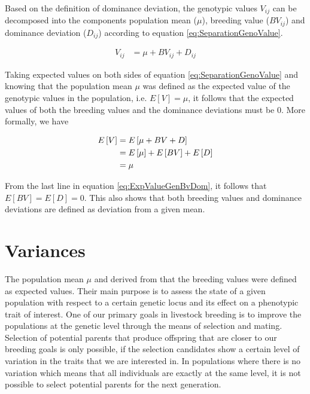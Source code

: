 \documentclass[]{book}
\theoremstyle{definition}
\theoremstyle{definition}
\theoremstyle{definition}
\theoremstyle{remark}
\begin{document}
Based on the definition of dominance deviation, the genotypic values \(V_{ij}\) can be decomposed into the components population mean (\(\mu\)), breeding value (\(BV_{ij}\)) and dominance deviation (\(D_{ij}\)) according to equation \eqref{eq:SeparationGenoValue}.

\begin{align}
V_{ij} &=   \mu + BV_{ij} + D_{ij}
\label{eq:SeparationGenoValue}
\end{align}

Taking expected values on both sides of equation \eqref{eq:SeparationGenoValue} and knowing that the population mean \(\mu\) was defined as the expected value of the genotypic values in the population, i.e. \(E\left[ V \right] = \mu\), it follows that the expected values of both the breeding values and the dominance deviations must be \(0\). More formally, we have

\begin{align}
E\left[ V \right] &=  E\left[ \mu + BV + D \right] \notag \\
                  &=  E\left[ \mu \right]  + E\left[ BV \right] + E\left[ D \right] \notag \\
                  &=  \mu
\label{eq:ExpValueGenBvDom}
\end{align}

From the last line in equation \eqref{eq:ExpValueGenBvDom}, it follows that \(E\left[ BV \right] = E\left[ D \right] = 0\). This also shows that both breeding values and dominance deviations are defined as deviation from a given mean.

\hypertarget{variances}{%
\section{Variances}\label{variances}}

The population mean \(\mu\) and derived from that the breeding values were defined as expected values. Their main purpose is to assess the state of a given population with respect to a certain genetic locus and its effect on a phenotypic trait of interest. One of our primary goals in livestock breeding is to improve the populations at the genetic level through the means of selection and mating. Selection of potential parents that produce offspring that are closer to our breeding goals is only possible, if the selection candidates show a certain level of variation in the traits that we are interested in. In populations where there is no variation which means that all individuals are exactly at the same level, it is not possible to select potential parents for the next generation.
\end{document}
